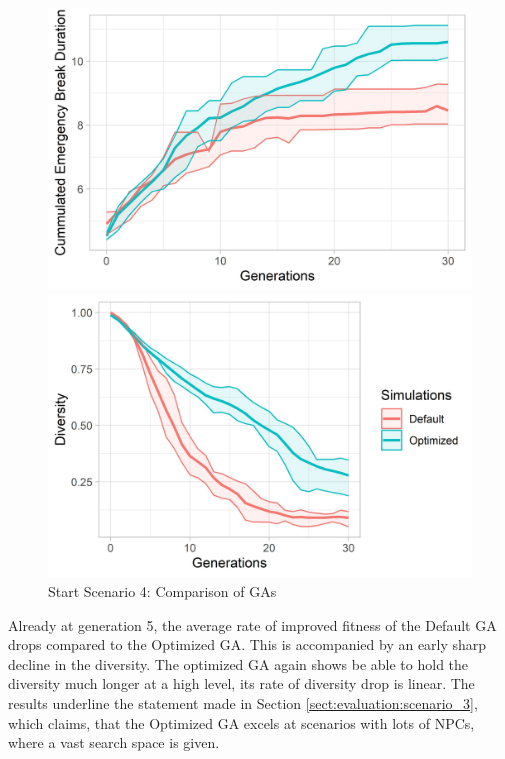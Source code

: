 \begin{figure}[ht] 
	\label{fig:evaluation:sim_4_ga_comparison}
	\begin{minipage}[b]{0.5\linewidth}
		\centering
		\includegraphics[width=1\linewidth]{simulations/evaluation/plots/sim_4_ga_generations} 
	\end{minipage}%
	\begin{minipage}[b]{0.5\linewidth}
		\centering
		\includegraphics[width=1\linewidth]{simulations/evaluation/plots/sim_4_ga_diversity} 
	\end{minipage} 
	\caption{Start Scenario 4: Comparison of GAs}
\end{figure}

Already at generation 5, the average rate of improved fitness of the Default GA drops compared to the Optimized GA. This is accompanied by an early sharp decline in the diversity. The optimized GA again shows be able to hold the diversity much longer at a high level, its rate of diversity drop is linear.
The results underline the statement made in Section \ref{sect:evaluation:scenario_3}, which claims, that the Optimized GA excels at scenarios with lots of NPCs, where a vast search space is given.



